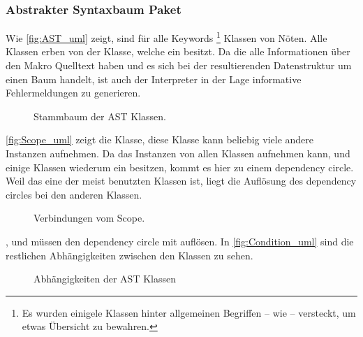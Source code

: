     \subsubsection{Abstrakter Syntaxbaum Paket}
    \label{sssec:Abstrakter Syntaxbaum Paket}
      Wie \autoref{fig:AST_uml} zeigt, sind für alle
      Keywords %
      \footnote{
        Es wurden einigele Klassen hinter allgemeinen Begriffen -- wie  -- versteckt, um etwas Übersicht zu bewahren.
      } Klassen von Nöten. Alle Klassen erben von der  Klasse,
      welche ein  besitzt. %
      Da die  alle Informationen über den Makro Quelltext haben und es sich bei der resultierenden Datenstruktur um einen
      Baum %
      handelt, ist auch der Interpreter in der Lage informative Fehlermeldungen zu generieren.
      \begin{figure}[H]
        \centering
        \caption{Stammbaum der AST Klassen.}
        \label{fig:AST_uml}
      \end{figure}

      \autoref{fig:Scope_uml} zeigt die  Klasse,
      diese Klasse kann beliebig viele andere  Instanzen aufnehmen. %
      Da das  Instanzen von allen  Klassen aufnehmen kann, und einige Klassen wiederum ein  besitzen, kommt es hier zu einem dependency circle. Weil das  eine der meist benutzten Klassen ist, liegt die Auflösung des dependency circles bei den anderen Klassen.
      \begin{figure}[H]
        \centering
        \caption{Verbindungen vom Scope.}
        \label{fig:Scope_uml}
      \end{figure}

      ,  und  müssen den dependency circle mit  auflösen. %
      In \autoref{fig:Condition_uml} sind die restlichen Abhängigkeiten zwischen den  Klassen zu sehen.
      \begin{figure}[H]
        \centering
        \caption{Abhängigkeiten der AST Klassen}
        \label{fig:Condition_uml}
      \end{figure}

